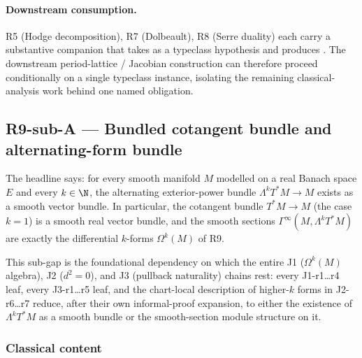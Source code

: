 \paragraph{Downstream consumption.}  R5 (Hodge decomposition), R7
(Dolbeault), R8 (Serre duality) each carry a substantive companion
that takes \code{[HasLaplaceResolvent M $\mu$]} as a typeclass
hypothesis and produces .
The downstream period-lattice / Jacobian construction can therefore
proceed conditionally on a single typeclass instance, isolating the
remaining classical-analysis work behind one named obligation.

\subsection{R9-sub-A --- Bundled cotangent bundle and alternating-form bundle}
\label{subsec:gap-R9subA-cotangent-alternating-bundle}

The headline says: for every smooth manifold \(M\) modelled on a
real Banach space \(E\) and every \(k\in\N\), the alternating
exterior-power bundle \(\Lambda^{k}T^{*}M\to M\) exists as a smooth
vector bundle.  In particular, the cotangent bundle
\(T^{*}M\to M\) (the case \(k=1\)) is a smooth real vector bundle,
and the smooth sections \(\Gamma^{\infty}(M,\Lambda^{k}T^{*}M)\) are
exactly the differential \(k\)-forms \(\Omega^{k}(M)\) of R9.

This sub-gap is the foundational dependency on which the entire
J1 (\(\Omega^{k}(M)\) algebra), J2 ($d^{2}=0$), and J3 (pullback
naturality) chains rest: every J1-r1\ldots r4 leaf, every
J3-r1\ldots r5 leaf, and the chart-local description of higher-\(k\)
forms in J2-r6\ldots r7 reduce, after their own informal-proof
expansion, to either the existence of \(\Lambda^{k}T^{*}M\) as a
smooth bundle or the smooth-section module structure on it.

\subsubsection*{Classical content}

